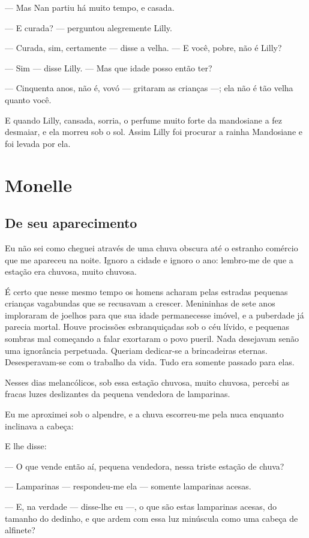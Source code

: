 --- Mas Nan partiu há muito tempo, e casada.

--- E curada? --- perguntou alegremente Lilly.

--- Curada, sim, certamente --- disse a velha. --- E você, pobre, não é Lilly?

--- Sim --- disse Lilly. --- Mas que idade posso então ter?

--- Cinquenta anos, não é, vovó --- gritaram as crianças ---; ela não é tão
velha quanto você.

E quando Lilly, cansada, sorria, o perfume muito forte da mandosiane a
fez desmaiar, e ela morreu sob o sol. Assim Lilly foi procurar a rainha
Mandosiane e foi levada por ela.

\chapter{Monelle}

\section*{De seu aparecimento}

Eu não sei como cheguei através de uma chuva obscura até o estranho
comércio que me apareceu na noite. Ignoro a cidade e ignoro o ano:
lembro-me de que a estação era chuvosa, muito chuvosa.

É certo que nesse mesmo tempo os homens acharam pelas estradas pequenas
crianças vagabundas que se recusavam a crescer. Menininhas de sete anos
imploraram de joelhos para que sua idade permanecesse imóvel, e a
puberdade já parecia mortal. Houve procissões esbranquiçadas sob o céu
lívido, e pequenas sombras mal começando a falar exortaram o povo pueril.
Nada desejavam senão uma ignorância perpetuada. Queriam dedicar-se a
brincadeiras eternas. Desesperavam-se com o trabalho da vida. Tudo era
somente passado para elas.

Nesses dias melancólicos, sob essa estação chuvosa, muito chuvosa,
percebi as fracas luzes deslizantes da pequena vendedora de lamparinas.

Eu me aproximei sob o alpendre, e a chuva escorreu-me pela nuca
enquanto inclinava a cabeça:

E lhe disse:

--- O que vende então aí, pequena vendedora, nessa triste estação de
chuva?

--- Lamparinas --- respondeu-me ela --- somente lamparinas acesas.

--- E, na verdade --- disse-lhe eu ---, o que são estas lamparinas acesas, do
tamanho do dedinho, e que ardem com essa luz minúscula como uma cabeça de
alfinete?

